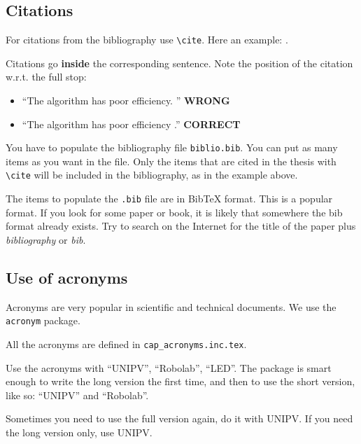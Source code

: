 \subsection{Citations}

For citations from the bibliography use \texttt{\textbackslash cite}.
Here an example: \cite{example-citation}.

Citations go \textbf{inside} the corresponding sentence.
Note the position of the citation w.r.t. the full stop:

\begin{itemize}
\item \enquote{The algorithm has poor efficiency. \cite{example-citation}} \textbf{WRONG}
\item \enquote{The algorithm has poor efficiency \cite{example-citation}.} \textbf{CORRECT}
\end{itemize}

You have to populate the bibliography file \texttt{biblio.bib}.
You can put as many items as you want in the file.
Only the items that are cited in the thesis with \texttt{\textbackslash cite} will be included in the bibliography, as in the example above.

The items to populate the \texttt{.bib} file are in BibTeX format.
This is a popular format.
If you look for some paper or book, it is likely that somewhere the bib format already exists.
Try to search on the Internet for the title of the paper plus \textit{bibliography} or \textit{bib}.

\subsection{Use of acronyms}

Acronyms are very popular in scientific and technical documents.
We use the \texttt{acronym} package.

All the acronyms are defined in \texttt{cap\_acronyms.inc.tex}.

Use the acronyms with \enquote{\ac{UNIPV}}, \enquote{\ac{Robolab}}, \enquote{\ac{LED}}.
The package is smart enough to write the long version the first time, and then to use the short version, like so: \enquote{\ac{UNIPV}} and \enquote{\ac{Robolab}}.

Sometimes you need to use the full version again, do it with \acf{UNIPV}.
If you need the long version only, use \acl{UNIPV}.

